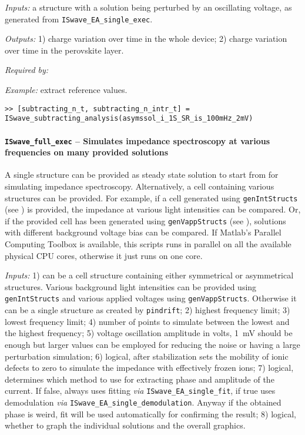 	\textit{Inputs:} a structure with a solution being perturbed by an
	oscillating voltage, as generated from \texttt{ISwave\_EA\_single\_exec}.

	\textit{Outputs:} 1) charge variation over time in the whole device;
	2) charge variation over time in the perovskite layer.


	\textit{Required by:}

	\textit{Example:} extract reference values.
	\begin{lstlisting}[style=Matlab-editor]
>> [subtracting_n_t, subtracting_n_intr_t] = ISwave_subtracting_analysis(asymssol_i_1S_SR_is_100mHz_2mV)
\end{lstlisting}

	\paragraph{\texttt{ISwave\_full\_exec} -- Simulates impedance spectroscopy at various frequencies on many provided solutions}
	A single structure can be provided as steady state solution to start from for simulating impedance spectroscopy.
	Alternatively, a cell containing various structures can be provided.
	For example, if a cell generated using \texttt{gen\-Int\-Structs} (see ) is provided, the impedance at various light intensities can be compared.
	Or, if the provided cell has been generated using \texttt{gen\-Vapp\-Structs} (see ), solutions with different background voltage bias can be compared.
	If Matlab's Parallel Computing Toolbox is available, this scripts runs in parallel on all the available physical CPU cores, otherwise it just runs on one core.

	\textit{Inputs:} 1) can be a cell structure containing either symmetrical or asymmetrical structures. Various background
	light intensities can be provided using \texttt{gen\-Int\-Structs} and various applied voltages using \texttt{gen\-Vapp\-Structs}.
	Otherwise it can be a single structure as created by \texttt{pindrift};
	2) highest frequency limit;
	3) lowest frequency limit;
	4) number of points to simulate between the lowest and
	the highest frequency;
	5) voltage oscillation amplitude in volts, \SI{1}{\mV} should be enough but larger values can be employed for reducing the noise or having a large perturbation simulation;
	6) logical, after stabilization sets the mobility of
	ionic defects to zero to simulate the impedance with effectively frozen ions;
	7) logical, determines which method to use for extracting phase and amplitude of the current.
	If false, always uses fitting \textsl{via} \texttt{ISwave\_EA\_single\_fit}, if true uses demodulation \textsl{via} \texttt{ISwave\_EA\_single\_demodulation}. Anyway if the obtained phase is weird, fit will be used
	automatically for confirming the result;
	8) logical, whether to graph the individual solutions and
	the overall graphics.

